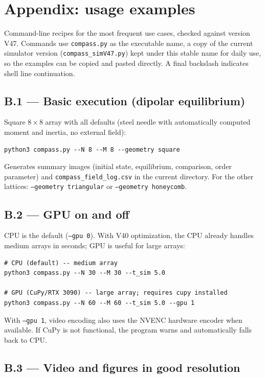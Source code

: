 \documentclass[11pt,a4paper]{article}
\newcommand{\code}[1]{\texttt{#1}}
\begin{document}
\section{Appendix: usage examples}
\label{app:exemplos}

Command-line recipes for the most frequent use cases, checked against version V47. Commands use \code{compass.py} as the executable name, a copy of the current simulator version (\code{compass\_simV47.py}) kept under this stable name for daily use, so the examples can be copied and pasted directly. A final backslash indicates shell line continuation.

\subsection*{B.1 --- Basic execution (dipolar equilibrium)}

Square $8\times8$ array with all defaults (steel needle with automatically computed moment and inertia, no external field):
\begin{verbatim}
python3 compass.py --N 8 --M 8 --geometry square
\end{verbatim}
Generates summary images (initial state, equilibrium, comparison, order parameter) and \code{compass\_field\_log.csv} in the current directory. For the other lattices: \code{--geometry triangular} or \code{--geometry honeycomb}.

\subsection*{B.2 --- GPU on and off}

CPU is the default (\code{--gpu 0}). With V40 optimization, the CPU already handles medium arrays in seconds; GPU is useful for large arrays:
\begin{verbatim}
# CPU (default) -- medium array
python3 compass.py --N 30 --M 30 --t_sim 5.0

# GPU (CuPy/RTX 3090) -- large array; requires cupy installed
python3 compass.py --N 60 --M 60 --t_sim 5.0 --gpu 1
\end{verbatim}
With \code{--gpu 1}, video encoding also uses the NVENC hardware encoder when available. If CuPy is not functional, the program warns and automatically falls back to CPU.

\subsection*{B.3 --- Video and figures in good resolution}
\end{document}
